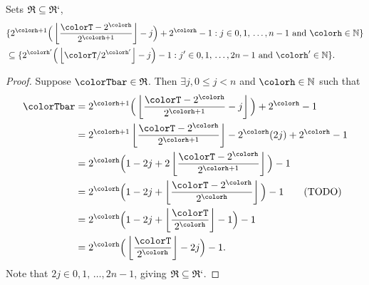 \begin{sublemma}
\label{thm:tilted-rsubset}
Sets $\mathfrak{R} \subseteq \mathfrak{R}`$,
\begin{align*}
&\{
  2^{\colorh + 1}\Big( \left\lfloor\frac{\colorT - 2^{\colorh}}{2^{\colorh + 1}} \right\rfloor - j\Big) + 2^{\colorh} - 1
  :
  j \in 0,1,\,\ldots,n-1
  \text{ and }
  \colorh \in \mathbb{N}
\}\\
&\subseteq
\{
  2^{\colorh'}\Big(\left\lfloor \colorT / 2^{\colorh'} \right\rfloor - j\Big) - 1
  :
  j' \in 0,1,\,\ldots,2n-1
  \text{ and }
  \colorh' \in \mathbb{N}
\}.
\end{align*}
\end{sublemma}
\begin{proof}
Suppose $\colorTbar \in \mathfrak{R}$.
Then $\exists j,  0 \leq j < n$ and $\colorh \in \mathbb{N}$ such that
\begin{align*}
\colorTbar
&= 2^{\colorh + 1}\Big(\left\lfloor \frac{\colorT - 2^{\colorh}}{2^{\colorh + 1}} - j\right\rfloor\Big) + 2^{\colorh} - 1\\
&= 2^{\colorh + 1}\left\lfloor \frac{\colorT - 2^{\colorh}}{2^{\colorh + 1}}\right\rfloor - 2^{\colorh}(2j) + 2^{\colorh} - 1\\
&= 2^{\colorh} \Big( 1 - 2j + 2\left\lfloor \frac{\colorT - 2^{\colorh}}{2^{\colorh + 1}} \right\rfloor \Big) - 1\\
&= 2^{\colorh} \Big( 1 - 2j + \left\lfloor \frac{\colorT - 2^{\colorh}}{2^{\colorh}} \right\rfloor \Big) - 1 \tag{TODO}\\
&= 2^{\colorh} \Big( 1 - 2j + \left\lfloor \frac{\colorT}{2^{\colorh}} \right\rfloor - 1 \Big) - 1\\
&= 2^{\colorh} \Big(\left\lfloor \frac{\colorT}{2^{\colorh}}\right\rfloor - 2j \Big) - 1.
\end{align*}
Note that $2j \in 0,1,\,\ldots,2n-1$, giving $\mathfrak{R} \subseteq \mathfrak{R}`$.
\end{proof}

